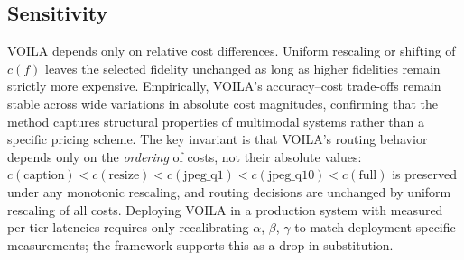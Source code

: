 \subsection{Sensitivity}
\label{sec:sensitivity}

VOILA depends only on relative cost differences.
Uniform rescaling or shifting of $c(f)$ leaves the selected fidelity unchanged
as long as higher fidelities remain strictly more expensive.
Empirically, VOILA’s accuracy--cost trade-offs remain stable across wide
variations in absolute cost magnitudes, confirming that the method captures
structural properties of multimodal systems rather than a specific pricing
scheme.
The key invariant is that \textsc{VOILA}’s routing behavior depends only on the \emph{ordering} of costs, not their absolute values: $c(\text{caption}) < c(\text{resize}) < c(\text{jpeg\_q1}) < c(\text{jpeg\_q10}) < c(\text{full})$ is preserved under any monotonic rescaling, and routing decisions are unchanged by uniform rescaling of all costs.
Deploying \textsc{VOILA} in a production system with measured per-tier latencies requires only recalibrating $\alpha$, $\beta$, $\gamma$ to match deployment-specific measurements; the framework supports this as a drop-in substitution.
